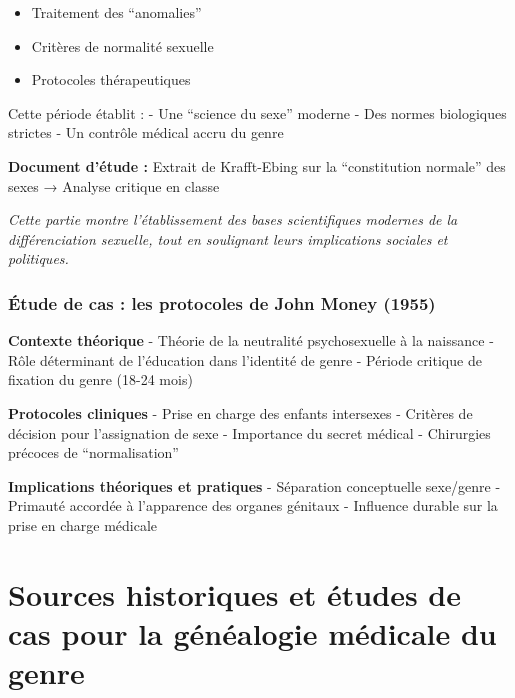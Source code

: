 \documentclass[
  letterpaper,
  DIV=11,
  numbers=noendperiod]{scrreprt}
\providecommand{\tightlist}{%
  \setlength{\itemsep}{0pt}\setlength{\parskip}{0pt}}\usepackage{longtable,booktabs,array}
\begin{document}
\begin{itemize}
\tightlist
\item
  Traitement des ``anomalies''
\item
  Critères de normalité sexuelle
\item
  Protocoles thérapeutiques
\end{itemize}

Cette période établit : - Une ``science du sexe'' moderne - Des normes
biologiques strictes - Un contrôle médical accru du genre

\textbf{Document d'étude :} Extrait de Krafft-Ebing sur la
``constitution normale'' des sexes → Analyse critique en classe

\emph{Cette partie montre l'établissement des bases scientifiques
modernes de la différenciation sexuelle, tout en soulignant leurs
implications sociales et politiques.}

\subsection{Étude de cas : les protocoles de John Money
(1955)}\label{uxe9tude-de-cas-les-protocoles-de-john-money-1955}

\textbf{Contexte théorique} - Théorie de la neutralité psychosexuelle à
la naissance - Rôle déterminant de l'éducation dans l'identité de genre
- Période critique de fixation du genre (18-24 mois)

\textbf{Protocoles cliniques} - Prise en charge des enfants intersexes -
Critères de décision pour l'assignation de sexe - Importance du secret
médical - Chirurgies précoces de ``normalisation''

\textbf{Implications théoriques et pratiques} - Séparation conceptuelle
sexe/genre - Primauté accordée à l'apparence des organes génitaux -
Influence durable sur la prise en charge médicale

\subsection{}\label{section-8}


\chapter{Sources historiques et études de cas pour la généalogie
médicale du
genre}\label{sources-historiques-et-uxe9tudes-de-cas-pour-la-guxe9nuxe9alogie-muxe9dicale-du-genre}
\end{document}
